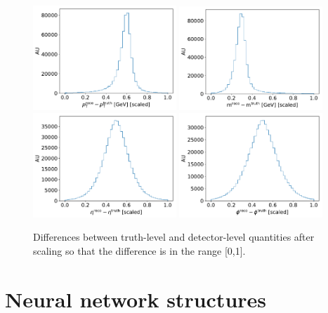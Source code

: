 \documentclass[showpacs,showkeys,preprint,prd,nofootinbib,linenumbers,12pt]{revtex4-1}
\begin{document}
\begin{figure}[h]
  \includegraphics[width=0.48\textwidth]{pTRes_bounds_scaled.pdf}
  \includegraphics[width=0.48\textwidth]{mRes_bounds_scaled.pdf}\\
  \includegraphics[width=0.48\textwidth]{etaRes_bounds_scaled.pdf}
  \includegraphics[width=0.48\textwidth]{phiRes_bounds_scaled.pdf}
  \caption{Differences between truth-level and detector-level quantities after scaling so that the difference is in the range [0,1].}
  \label{fig:deltaTarget}
\end{figure}

\section{Neural network structures}
\end{document}
